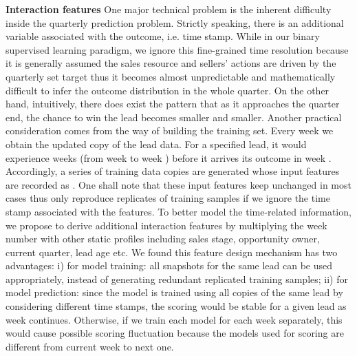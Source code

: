 \documentclass[10pt,conference]{IEEEtran}
\begin{document}
\textbf{Interaction features} One major technical problem is the inherent difficulty inside the quarterly prediction problem. Strictly speaking, there is an additional variable associated with the outcome, i.e. time stamp. While in our binary supervised learning paradigm, we ignore this fine-grained time resolution because it is generally assumed the sales resource and sellers' actions are driven by the quarterly set target thus it becomes almost unpredictable and mathematically difficult to infer the outcome distribution in the whole quarter. On the other hand, intuitively, there does exist the pattern that as it approaches the quarter end, the chance to win the lead becomes smaller and smaller. Another practical consideration comes from the way of building the training set. Every week we obtain the updated copy of the lead data. For a specified lead, it would experience  weeks (from week  to week ) before it arrives its outcome in week . Accordingly, a series of training data copies are generated whose input features are recorded as . One shall note that these input features keep unchanged in most cases thus only reproduce replicates of training samples if we ignore the time stamp associated with the features. To better model the time-related information, we propose to derive additional interaction features by multiplying the week number with other static profiles including sales stage, opportunity owner, current quarter, lead age etc. We found this feature design mechanism has two advantages: i) for model training: all snapshots for the same lead can be used appropriately, instead of generating redundant replicated training samples; ii) for model prediction: since the model is trained using all copies of the same lead by considering different time stamps, the scoring would be stable for a given lead as week continues. Otherwise, if we train each model for each week separately, this would cause possible scoring fluctuation because the models used for scoring are different from current week to next one.
\end{document}
